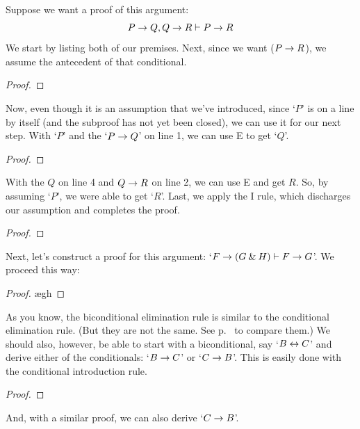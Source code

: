 \begin{earg}
\item Suppose we want a proof of this argument:
	$$P \rightarrow Q, Q \rightarrow R \vdash P \rightarrow R$$
We start by listing both of our premises. Next, since we want ($P \rightarrow R$), we assume the antecedent of that conditional. 
\begin{proof}
	 \pr{}
	 \pr{}
	\open
		 \as{}
	\close
\end{proof}
Now, even though it is an assumption that we've introduced, since `$P$' is on a line by itself (and the subproof has not yet been closed), we can use it for our next step. With `$P$' and the `$P \rightarrow Q$' on line 1, we can use {\eif}E to get `$Q$'. 
\begin{proof}
	 \pr{}
	 \pr{}
	\open
		\as{}
	\close
\end{proof}
With the $Q$ on line 4 and $Q \rightarrow R$ on line 2, we can use {\eif}E and get $R$. So, by assuming `$P$', we were able to get `$R$'. Last, we apply the {\eif}I rule, which discharges our assumption and completes the proof.
\label{HSproof}
\begin{proof}
	 \pr{}
	 \pr{}
	\open
		\as{}
	\close
\end{proof}

\item Next, let's construct a proof for this argument: `$F \rightarrow (G \mathbin{\&} H) \vdash F \rightarrow G$'. We proceed this way:

\begin{proof}
	 \pr{}
	\open
		\as{}
		\ae{gh}
	\close
\end{proof}

\item As you know, the biconditional elimination rule is similar to the conditional elimination rule. (But they are not the same. See p.~\pageref{ce-rule} to compare them.) We should also, however, be able to start with a biconditional, say `$B \leftrightarrow C$' and derive either of the conditionals: `$B \rightarrow C$' or `$C \rightarrow B$'. This is easily done with the conditional introduction rule.
\begin{proof}
	 \pr{}
	\open
		\as{}
	\close
\end{proof}
\smallskip
\noindent And, with a similar proof, we can also derive `$C \rightarrow B$'.


\end{earg}

